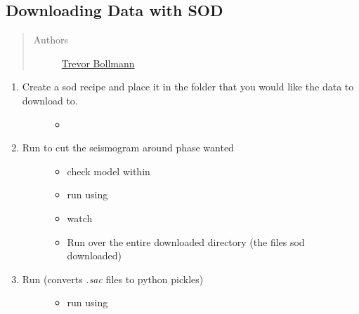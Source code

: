 \documentclass[letterpaper,10pt,english]{sphinxmanual}
\begin{document}
\subsection{Downloading Data with SOD}
\label{docfiles/gettingData:downloading-data-with-sod}\begin{quote}\begin{description}
\item[{Authors}] \leavevmode
\href{http://www.earth.northwestern.edu/~trevor/Welcome.html}{Trevor Bollmann}

\end{description}\end{quote}
\begin{enumerate}
\item {} \begin{description}
\item[{Create a sod recipe and place it in the folder that you would like the data to download to.}] \leavevmode\begin{itemize}
\item {} 

\end{itemize}

\end{description}

\item {} \begin{description}
\item[{Run  to cut the seismogram around phase wanted}] \leavevmode\begin{itemize}
\item {} 
check model within 

\item {} 
run using 

\item {} 
watch 

\item {} 
Run over the entire downloaded directory (the files sod downloaded)

\end{itemize}

\end{description}

\item {} \begin{description}
\item[{Run  (converts \emph{.sac} files to python pickles)}] \leavevmode\begin{itemize}
\item {} 
run using 


\end{itemize}
\end{description}
\end{enumerate}
\end{document}

